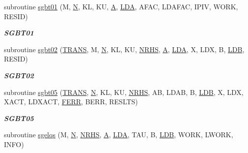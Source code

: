 \begin{DoxyCompactItemize}
subroutine \hyperlink{group__single__lin_gacc3615c37d2cf3a48d7acb15b3991ae8}{sgbt01} (M, \hyperlink{polmisc_8c_a0240ac851181b84ac374872dc5434ee4}{N}, K\+L, K\+U, \hyperlink{classA}{A}, \hyperlink{example__user_8c_ae946da542ce0db94dced19b2ecefd1aa}{L\+D\+A}, A\+F\+A\+C, L\+D\+A\+F\+A\+C, I\+P\+I\+V, W\+O\+R\+K, R\+E\+S\+I\+D)
\begin{DoxyCompactList}\small\item\em {\bfseries S\+G\+B\+T01} \end{DoxyCompactList}\item 
subroutine \hyperlink{group__single__lin_ga6f965d11de292c5d08aeddff2e14f723}{sgbt02} (\hyperlink{superlu__enum__consts_8h_a0c4e17b2d5cea33f9991ccc6a6678d62a1f61e3015bfe0f0c2c3fda4c5a0cdf58}{T\+R\+A\+N\+S}, M, \hyperlink{polmisc_8c_a0240ac851181b84ac374872dc5434ee4}{N}, K\+L, K\+U, \hyperlink{example__user_8c_aa0138da002ce2a90360df2f521eb3198}{N\+R\+H\+S}, \hyperlink{classA}{A}, \hyperlink{example__user_8c_ae946da542ce0db94dced19b2ecefd1aa}{L\+D\+A}, X, L\+D\+X, B, \hyperlink{example__user_8c_a50e90a7104df172b5a89a06c47fcca04}{L\+D\+B}, R\+E\+S\+I\+D)
\begin{DoxyCompactList}\small\item\em {\bfseries S\+G\+B\+T02} \end{DoxyCompactList}\item 
subroutine \hyperlink{group__single__lin_ga05b9626b0347b8dfe57f1770c0603e88}{sgbt05} (\hyperlink{superlu__enum__consts_8h_a0c4e17b2d5cea33f9991ccc6a6678d62a1f61e3015bfe0f0c2c3fda4c5a0cdf58}{T\+R\+A\+N\+S}, \hyperlink{polmisc_8c_a0240ac851181b84ac374872dc5434ee4}{N}, K\+L, K\+U, \hyperlink{example__user_8c_aa0138da002ce2a90360df2f521eb3198}{N\+R\+H\+S}, A\+B, L\+D\+A\+B, B, \hyperlink{example__user_8c_a50e90a7104df172b5a89a06c47fcca04}{L\+D\+B}, X, L\+D\+X, X\+A\+C\+T, L\+D\+X\+A\+C\+T, \hyperlink{superlu__enum__consts_8h_af00a42ecad444bbda75cde1b64bd7e72a78fd14d7abebae04095cfbe02928f153}{F\+E\+R\+R}, B\+E\+R\+R, R\+E\+S\+L\+T\+S)
\begin{DoxyCompactList}\small\item\em {\bfseries S\+G\+B\+T05} \end{DoxyCompactList}\item 
subroutine \hyperlink{group__single__lin_ga2d8ca685a386b124fa546633f43483d9}{sgelqs} (M, \hyperlink{polmisc_8c_a0240ac851181b84ac374872dc5434ee4}{N}, \hyperlink{example__user_8c_aa0138da002ce2a90360df2f521eb3198}{N\+R\+H\+S}, \hyperlink{classA}{A}, \hyperlink{example__user_8c_ae946da542ce0db94dced19b2ecefd1aa}{L\+D\+A}, T\+A\+U, B, \hyperlink{example__user_8c_a50e90a7104df172b5a89a06c47fcca04}{L\+D\+B}, W\+O\+R\+K, L\+W\+O\+R\+K, I\+N\+F\+O)

\end{DoxyCompactItemize}
